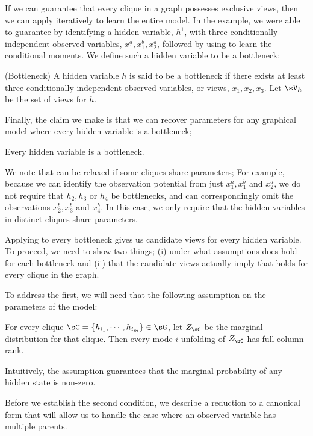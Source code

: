 If we can guarantee that every clique in a graph possesses exclusive
  views, then we can apply \LearnClique iteratively to learn the entire
  model.
In the example, we were able to guarantee 
  by identifying a hidden variable, $h^1$, with three conditionally
  independent observed variables, $x^a_1, x^b_1, x^a_2$, followed by
  using \TensorFactorize to learn the conditional moments.
We define such a hidden variable to be a bottleneck;
\begin{definition}(Bottleneck)
  A hidden variable $h$ is said to be a bottleneck if there exists at
    least three conditionally independent observed variables, or views,
    $x_1, x_2, x_3$. 
  Let $\sV_{h}$ be the set of views for $h$.
\end{definition}
Finally, the claim we make is that we can recover parameters for any
  graphical model where every hidden variable is a bottleneck;
\begin{property}
  \label{prop:bottleneck}
  Every hidden variable is a bottleneck.
\end{property}
We note that  can be relaxed if some cliques
  share parameters;
For example, because we can identify the observation potential from just
  $x^a_1, x^b_1$ and $x^a_2$, we do not require that $h_2, h_3$ or $h_4$
  be bottlenecks, and can correspondingly omit the observations $x^b_2,
  x^b_3$ and $x^b_4$.
In this case, we only require that the hidden variables in distinct
  cliques share parameters.

Applying \TensorFactorize to every bottleneck gives us candidate views
  for every hidden variable. 
To proceed, we need to show two things; (i) under what assumptions
  does  hold for each bottleneck and (ii)
  that the candidate views actually imply that 
  holds for every clique in the graph.

To address the first, we will need that the following assumption on the
  parameters of the model:
\begin{assumption} 
  \label{asm:full-rank-plus}
  For every clique $\sC = \{h_{i_1}, \cdots, h_{i_m}\} \in \sG$, let
    $Z_\sC$ be the marginal distribution for that clique. 
  Then every mode-$i$ unfolding of $Z_\sC$ has full column rank.
\end{assumption}
Intuitively, the assumption guarantees that the marginal probability of
  any hidden state is non-zero.

Before we establish the second condition, we describe a reduction to
  a canonical form that will allow us to handle the case where an observed
  variable has multiple parents.

